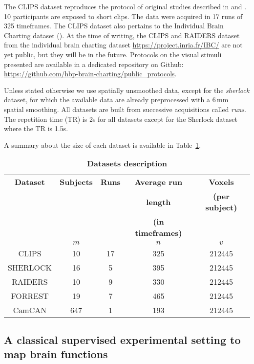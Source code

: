 The CLIPS dataset reproduces the protocol of original studies described in
\cite{nishimoto2011reconstructing} and \cite{huth2012continuous}. 10
participants are exposed to short clips. The data were acquired in 17 runs of 325 timeframes. 
%
The CLIPS dataset also pertains to the Individual Brain Charting dataset
(\cite{ibc}).
%
At the time of writing, the CLIPS and RAIDERS dataset from the individual brain charting dataset \url{https://project.inria.fr/IBC/} are not yet public, but they will be in the future. Protocols on the visual stimuli presented are available in a dedicated repository on Github: \url{https://github.com/hbp-brain-charting/public_protocols}.

Unless stated otherwise we use spatially unsmoothed data, except for the
\emph{sherlock} dataset, for which the available data are already preprocessed
with a 6\,mm spatial smoothing. All datasets are built from successive
acquisitions called \emph{runs}. The repetition time (TR) is 2s for all datasets
except for the Sherlock dataset where the TR is 1.5s.
%

A summary about the size of each dataset is available in Table~\ref{tab:dataset_desc2}.
\begin{table}
	\begin{tabular}{|c|c|c|c|c|}
		\hline
		\textbf{Dataset} & \textbf{Subjects} & \textbf{Runs} & \textbf{Average run} & \textbf{Voxels} \\
                     && & \textbf{length} & \textbf{(per subject)} \\
                     && & \textbf{(in timeframes)} &  \\
                     &$m$& $ $ & $n$ &$v$  \\
		\hline
		CLIPS & 10 & 17 & 325 & 212445\\ 
		\hline
		SHERLOCK & 16 & 5 & 395 & 212445 \\ 
		\hline
		RAIDERS & 10 & 9 & 330 & 212445 \\
		\hline 
		FORREST & 19 & 7 & 465 & 212445\\
		\hline
		CamCAN & 647 & 1 & 193 & 212445 \\
		\hline
	\end{tabular}
  \caption{\textbf{Datasets description}}
  \label{tab:dataset_desc2}
\end{table}
\subsection{A classical supervised experimental setting to map brain functions}

